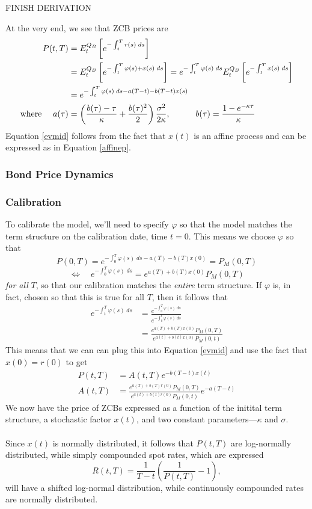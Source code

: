 \documentclass[a4paper,12pt]{scrartcl}
\begin{document}
FINISH DERIVATION

At the very end, we see that ZCB prices are
\begin{align}
   \label{evmid}
   P(t,T) &= E_t^{Q_B} \left[ e^{-\int^T_t r(s) \; ds} \right]\notag\\
   &= E_t^{Q_B} \left[ e^{-\int^T_t \varphi(s) + x(s) \; ds} \right]
   = e^{-\int^T_t \varphi(s) \; ds}
      E_t^{Q_B} \left[ e^{-\int^T_t x(s) \; ds} \right]\notag\\
   &= e^{-\int_t^T \varphi(s) \; ds - a(T-t) - b(T-t) x(s)} \\
   \text{where }\quad a(\tau) &= \left( \frac{b(\tau) - \tau}{\kappa}
      + \frac{b(\tau)^2}{2}\right)\frac{\sigma^2}{2\kappa}, \qquad\quad
   b(\tau) = \frac{1-e^{-\kappa \tau}}{\kappa}\notag
\end{align}
Equation \ref{evmid} follows from the fact that $x(t)$ is an 
affine process and can be expressed as in Equation \ref{affinep}.


\newpage
\subsubsection{Bond Price Dynamics}

\subsubsection{Calibration}
To calibrate the model, we'll need
to specify $\varphi$ so that the model matches the term structure
on the calibration date, time $t=0$. This means we choose $\varphi$
so that
\[ P(0,T) = e^{-\int^T_0 \varphi(s) \; ds - a(T) - b(T) x(0)} = 
   P_M(0,T) \]
\[ \Leftrightarrow \quad e^{-\int^T_0 \varphi(s) \; ds} = 
   e^{a(T) + b(T) x(0)} P_M(0,T) \]
\emph{for all} $T$, so that our calibration matches the \emph{entire}
term structure. If $\varphi$ is, in fact, chosen so that this is true
for all $T$, then it follows that 
\begin{align*} 
   e^{-\int^T_t \varphi(s) \; ds} &= \frac{
      e^{-\int^T_0 \varphi(s) \; ds}}{e^{-\int^t_0 \varphi(s) \; ds}}\\
   &= \frac{e^{a(T) + b(T) x(0)} P_M(0,T)}{e^{a(t) + b(t) x(0)} 
      P_M(0,t)} 
\end{align*}
This means that we can can plug this into Equation \ref{evmid} and
use the fact that $x(0) = r(0)$ to get
\begin{align*}
   P(t,T) &= A(t,T) e^{-b(T-t) x(t)} \\
   A(t,T) &= \frac{e^{a(T) + b(T) r(0)} P_M(0,T)}{
      e^{a(t) + b(t) r(0)} P_M(0,t)} e^{-a(T-t)}
\end{align*}
We now have the price of ZCBs expressed as a function of the initital
term structure, a stochastic factor $x(t)$, and two constant 
parameters---$\kappa$ and $\sigma$. 
\\
\\
Since $x(t)$ is normally distributed, it follows that $P(t,T)$ are
log-normally distributed, while simply compounded spot rates, which
are expressed
   \[ R(t,T) = \frac{1}{T-t} \left(\frac{1}{P(t,T)}-1\right), \]
will have a shifted log-normal distribution, while continuously
compounded rates are normally distributed.
\end{document}

